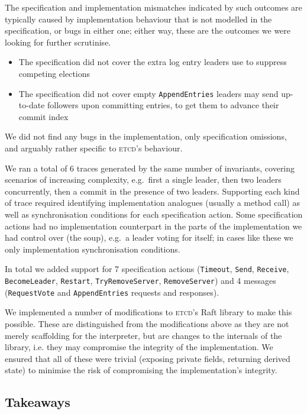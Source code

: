\documentclass[a4paper]{article}
\newcommand{\tname}[1]{\textsc{#1}\xspace}
\newcommand{\etcd}{\tname{etcd}}
\begin{document}
The specification and implementation mismatches indicated by such outcomes are typically caused by implementation behaviour that is not modelled in the specification, or bugs in either one; either way, these are the outcomes we were looking for further scrutinise.

\begin{itemize}
\item The specification did not cover the extra log entry leaders use to suppress competing elections
\item The specification did not cover empty \texttt{AppendEntries} leaders may send up-to-date followers upon committing entries, to get them to advance their commit index
\end{itemize}

We did not find any bugs in the implementation, only specification omissions, and arguably rather specific to \etcd's behaviour.

We ran a total of 6 traces generated by the same number of invariants, covering scenarios of increasing complexity, e.g.~first a single leader, then two leaders concurrently, then a commit in the presence of two leaders.
%
Supporting each kind of trace required identifying implementation analogues (usually a method call) as well as synchronisation conditions for each specification action.
%
Some specification actions had no implementation counterpart in the parts of the implementation we had control over (the soup), e.g.~a leader voting for itself; in cases like these we only implementation synchronisation conditions.

In total we added support for 7 specification actions (\texttt{Timeout}, \texttt{Send}, \texttt{Receive}, \texttt{BecomeLeader}, \texttt{Restart}, \texttt{TryRemoveServer}, \texttt{RemoveServer}) and 4 messages (\texttt{RequestVote} and \texttt{AppendEntries} requests and responses).

We implemented a number of modifications to \etcd's Raft library to make this possible.
%
These are distinguished from the modifications above as they are not merely scaffolding for the interpreter, but are changes to the internals of the library, i.e.
%
they may compromise the integrity of the implementation.
%
We ensured that all of these were trivial (exposing private fields, returning derived state) to minimise the risk of compromising the implementation's integrity.

\subsection{Takeaways}
\end{document}
